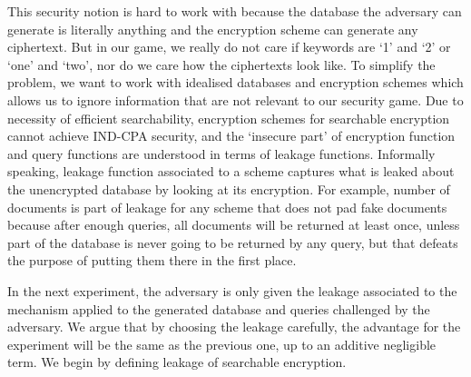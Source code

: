 This security notion is hard to work with because the database the adversary can generate is literally anything and the encryption scheme can generate any ciphertext. But in our game, we really do not care if keywords are `1' and `2' or `one' and `two', nor do we care how the ciphertexts look like. To simplify the problem, we want to work with idealised databases and encryption schemes which allows us to ignore information that are not relevant to our security game. Due to necessity of efficient searchability, encryption schemes for searchable encryption cannot achieve IND-CPA security, and the `insecure part' of encryption function and query functions are understood in terms of leakage functions. Informally speaking, leakage function associated to a scheme captures what is leaked about the unencrypted database by looking at its encryption. For example, number of documents is part of leakage for any scheme that does not pad fake documents because after enough queries, all documents will be returned at least once, unless part of the database is never going to be returned by any query, but that defeats the purpose of putting them there in the first place.

In the next experiment, the adversary is only given the leakage associated to the mechanism applied to the generated database and queries challenged by the adversary. We argue that by choosing the leakage carefully, the advantage for the experiment will be the same as the previous one, up to an additive negligible term. We begin by defining leakage of searchable encryption.


